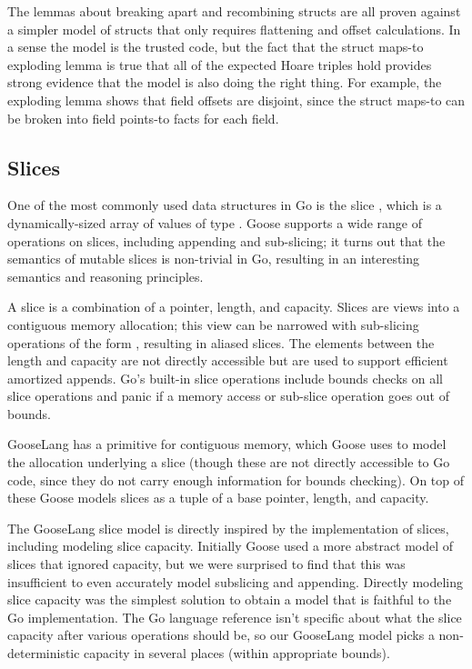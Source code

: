 The lemmas about breaking apart and recombining structs are all proven
against a simpler model of structs that only requires flattening and
offset calculations. In a sense the model is the trusted code, but the
fact that the struct maps-to exploding lemma is true that all of the
expected Hoare triples hold provides strong evidence that the model is
also doing the right thing. For example, the exploding lemma shows that
field offsets are disjoint, since the struct maps-to can be broken into
field points-to facts for each field.

\subsection{Slices}%
\label{sec:goose:slices}

One of the most commonly used data structures in Go is the slice
, which is a dynamically-sized array of values of type
. Goose supports a wide range of operations on slices,
including appending and sub-slicing; it turns out that the semantics of
mutable slices is non-trivial in Go, resulting in an interesting
semantics and reasoning principles.

A slice is a combination of a pointer, length, and capacity. Slices are
views into a contiguous memory allocation; this view can be narrowed
with sub-slicing operations of the form , resulting
in aliased slices. The elements between the length and capacity are not
directly accessible but are used to support efficient amortized appends.
Go's built-in slice operations include bounds checks on all slice
operations and panic if a memory access or sub-slice operation goes out
of bounds.

GooseLang has a primitive for contiguous memory, which Goose uses to model
the allocation underlying a slice (though these are not directly
accessible to Go code, since they do not carry enough information for
bounds checking). On top of these Goose models slices as a tuple of a base
pointer, length, and capacity.

The GooseLang slice model is directly inspired by the implementation of
slices, including modeling slice capacity. Initially Goose used a more
abstract model of slices that ignored capacity, but we were surprised to find that this was insufficient to
even accurately model subslicing and appending. Directly modeling slice
capacity was the simplest solution to obtain a model that is faithful to
the Go implementation. The Go language reference isn't specific about
what the slice capacity after various operations should be, so our
GooseLang model picks a non-deterministic capacity in several places
(within appropriate bounds).


